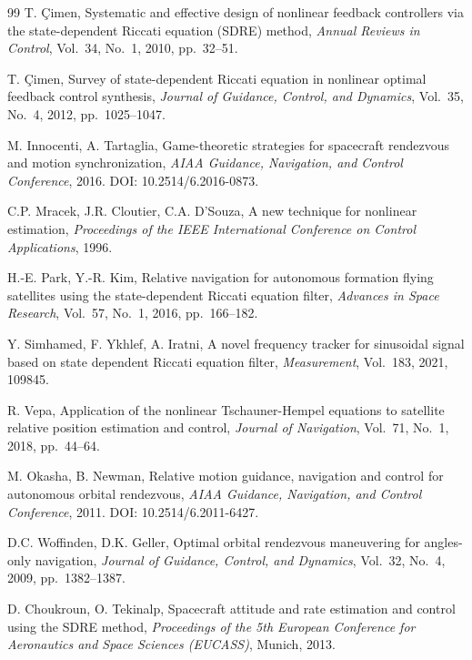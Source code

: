 \documentclass[preprint,3p,times]{elsarticle}
\begin{document}
\begin{thebibliography}{99}
T. \c{C}imen,
\newblock Systematic and effective design of nonlinear feedback controllers via the state-dependent Riccati equation (SDRE) method,
\newblock \emph{Annual Reviews in Control}, Vol.~34, No.~1, 2010, pp.~32--51.

T. \c{C}imen,
\newblock Survey of state-dependent Riccati equation in nonlinear optimal feedback control synthesis,
\newblock \emph{Journal of Guidance, Control, and Dynamics}, Vol.~35, No.~4, 2012, pp.~1025--1047.

M. Innocenti, A. Tartaglia,
\newblock Game-theoretic strategies for spacecraft rendezvous and motion synchronization,
\newblock \emph{AIAA Guidance, Navigation, and Control Conference}, 2016. DOI: 10.2514/6.2016-0873.

C.P. Mracek, J.R. Cloutier, C.A. D'Souza,
\newblock A new technique for nonlinear estimation,
\newblock \emph{Proceedings of the IEEE International Conference on Control Applications}, 1996.

H.-E. Park, Y.-R. Kim,
\newblock Relative navigation for autonomous formation flying satellites using the state-dependent Riccati equation filter,
\newblock \emph{Advances in Space Research}, Vol.~57, No.~1, 2016, pp.~166--182.

Y. Simhamed, F. Ykhlef, A. Iratni,
\newblock A novel frequency tracker for sinusoidal signal based on state dependent Riccati equation filter,
\newblock \emph{Measurement}, Vol.~183, 2021, 109845.

R. Vepa,
\newblock Application of the nonlinear Tschauner-Hempel equations to satellite relative position estimation and control,
\newblock \emph{Journal of Navigation}, Vol.~71, No.~1, 2018, pp.~44--64.

M. Okasha, B. Newman,
\newblock Relative motion guidance, navigation and control for autonomous orbital rendezvous,
\newblock \emph{AIAA Guidance, Navigation, and Control Conference}, 2011. DOI: 10.2514/6.2011-6427.

D.C. Woffinden, D.K. Geller,
\newblock Optimal orbital rendezvous maneuvering for angles-only navigation,
\newblock \emph{Journal of Guidance, Control, and Dynamics}, Vol.~32, No.~4, 2009, pp.~1382--1387.

D. Choukroun, O. Tekinalp,
\newblock Spacecraft attitude and rate estimation and control using the SDRE method,
\newblock \emph{Proceedings of the 5th European Conference for Aeronautics and Space Sciences (EUCASS)}, Munich, 2013.


\end{thebibliography}
\end{document}
